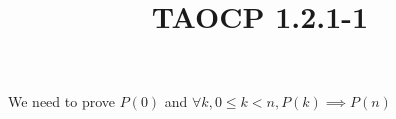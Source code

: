 \documentclass{article}
\title{TAOCP 1.2.1\mbox{-}1}
\begin{document}
\maketitle

We need to prove \( P(0) \) and \( \forall k, 0 \leq k < n, P(k) \implies P(n) \)
\end{document}
